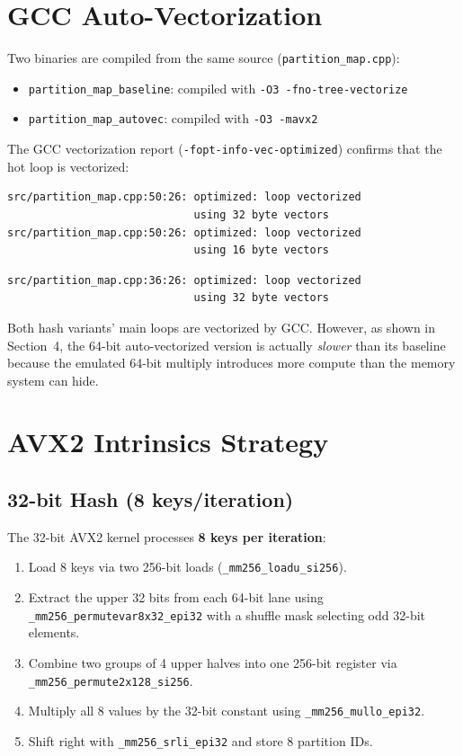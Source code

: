 \documentclass[11pt,a4paper]{article}
\begin{document}
\section{GCC Auto-Vectorization}

Two binaries are compiled from the same source (\texttt{partition\_map.cpp}):
\begin{itemize}
  \item \texttt{partition\_map\_baseline}: compiled with \texttt{-O3 -fno-tree-vectorize}
  \item \texttt{partition\_map\_autovec}: compiled with \texttt{-O3 -mavx2}
\end{itemize}

The GCC vectorization report (\texttt{-fopt-info-vec-optimized}) confirms that the hot loop is vectorized:

\begin{lstlisting}[language={},title={vec\_optimized\_32.txt (excerpt)}]
src/partition_map.cpp:50:26: optimized: loop vectorized
                             using 32 byte vectors
src/partition_map.cpp:50:26: optimized: loop vectorized
                             using 16 byte vectors
\end{lstlisting}

\begin{lstlisting}[language={},title={vec\_optimized\_64.txt (excerpt)}]
src/partition_map.cpp:36:26: optimized: loop vectorized
                             using 32 byte vectors
\end{lstlisting}

Both hash variants' main loops are vectorized by GCC. However, as shown in Section~4, the 64-bit auto-vectorized version is actually \emph{slower} than its baseline because the emulated 64-bit multiply introduces more compute than the memory system can hide.

\section{AVX2 Intrinsics Strategy}

\subsection{32-bit Hash (8 keys/iteration)}

The 32-bit AVX2 kernel processes \textbf{8 keys per iteration}:
\begin{enumerate}
  \item Load 8 keys via two 256-bit loads (\texttt{\_mm256\_loadu\_si256}).
  \item Extract the upper 32 bits from each 64-bit lane using \texttt{\_mm256\_permutevar8x32\_epi32} with a shuffle mask selecting odd 32-bit elements.
  \item Combine two groups of 4 upper halves into one 256-bit register via \texttt{\_mm256\_permute2x128\_si256}.
  \item Multiply all 8 values by the 32-bit constant using \texttt{\_mm256\_mullo\_epi32}.
  \item Shift right with \texttt{\_mm256\_srli\_epi32} and store 8 partition IDs.
\end{enumerate}
\end{document}
